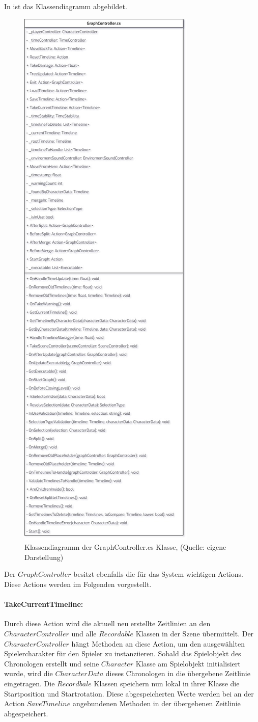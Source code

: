 In  ist das Klassendiagramm abgebildet.
\begin{figure}[p]
\centering
\includegraphics[width=0.5\linewidth]{content/pictures/GraphController.jpg}
\caption{Klassendiagramm der GraphController.cs Klasse, (Quelle: eigene Darstellung)}
\label{fig:graphController-cs}
\end{figure}
Der $GraphController$ besitzt ebenfalls die für das System wichtigen Actions. Diese Actions werden im Folgenden vorgestellt.
\newpage
\paragraph{TakeCurrentTimeline:}
Durch diese Action wird die aktuell neu erstellte Zeitlinien an den $CharacterController$ und alle $Recordable$ Klassen in der Szene übermittelt. Der $CharacterController$ hängt Methoden an diese Action, um den ausgewählten Spielercharakter für den Spieler zu instanziieren. Sobald das Spielobjekt des Chronologen erstellt und seine $Character$ Klasse am Spielobjekt initialisiert wurde, wird die $CharacterData$ dieses Chronologen in die übergebene Zeitlinie eingetragen. 
Die $Recordbale$ Klassen speichern nun lokal in ihrer Klasse die Startposition und Startrotation. Diese abgespeicherten Werte werden bei an der Action $SaveTimeline$ angebundenen Methoden in der übergebenen Zeitlinie abgespeichert.

